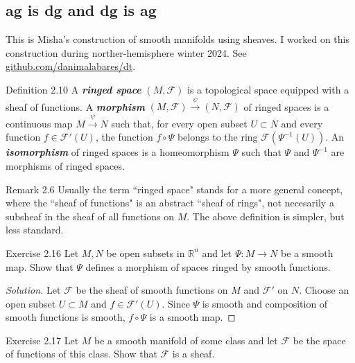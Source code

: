 \subsection{ag is dg and dg is ag}

This is Misha's construction of smooth manifolds using sheaves. I worked on this construction during norther-hemisphere winter 2024. See \href{https://github.com/danimalabares/dt}{github.com/danimalabares/dt}.

\begin{thing3}{Definition 2.10}\leavevmode
	A \textit{\textbf{ringed space}} $(M,\mathcal{F})$ is a topological space equipped with a sheaf of functions. A \textit{\textbf{morphism}} $(M,\mathcal{F}) \xrightarrow{\psi}(N,\mathcal{F})$ of ringed spaces is a continuous map $M \xrightarrow{\psi}N$ such that, for every open subset $U \subset N$ and every function $f \in \mathcal{F}'(U)$, the function $f \circ \Psi$ belongs to the ring $\mathcal{F}(\Psi^{-1}(U))$. An \textit{\textbf{isomorphism}} of ringed spaces is a homeomorphism $\Psi$ such that $\Psi$ and $\Psi^{-1}$ are morphisms of ringed spaces.
\end{thing3}

\begin{thing5}{Remark 2.6}\leavevmode
	Usually the term ``ringed space" stands for a more general concept, where the ``sheaf of functions" is an abstract ``sheaf of rings", not necesarily a subsheaf in the sheaf of all functions on  $M$. The above definition is simpler, but less standard.
\end{thing5}

\begin{thing4}{Exercise 2.16}\label{exer:2.16}\leavevmode
Let $M, N$ be open subsets in $\mathbb{R}^n$ and let  $\Psi:M \to N$ be a smooth map. Show that $\Psi$ defines a morphism of spaces ringed by smooth functions.
\end{thing4}

\begin{proof}[Solution]\leavevmode
Let $\mathcal{F}$ be the sheaf of smooth functions on $M$ and  $\mathcal{F}'$ on $N$. Choose an open subset $U\subset M$ and $f \in \mathcal{F}'(U)$. Since $\Psi$ is smooth and composition of smooth functions is smooth, $f \circ \Psi$ is a smooth map.
\end{proof}

\begin{thing4}{Exercise 2.17}\label{exer:2.17}\leavevmode
Let $M$ be a smooth manifold of some class and let $\mathcal{F}$ be the space of functions of this class. Show that $\mathcal{F}$ is a sheaf.
\end{thing4}

